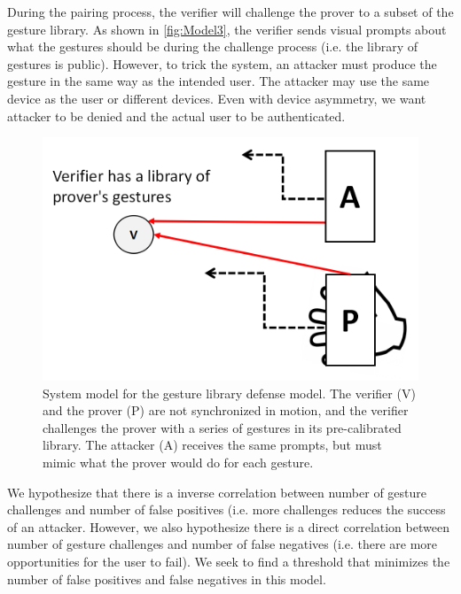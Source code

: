 \begin{itemize}
During the pairing process, the verifier will challenge the prover to a subset of the gesture library. As shown in \autoref{fig:Model3}, the verifier sends visual prompts about what the gestures should be during the challenge process (i.e. the library of gestures is public). However, to trick the system, an attacker must produce the gesture in the same way as the intended user. The attacker may use the same device as the user or different devices. Even with device asymmetry, we want attacker to be denied and the actual user to be authenticated. 

\begin{figure}[!tb]
\centering
\includegraphics[width=0.65 \linewidth]{./figures/model3.png}
\caption{System model for the gesture library defense model. The verifier (V) and the prover (P) are not synchronized in motion, and the verifier challenges the prover with a series of gestures in its pre-calibrated library. The attacker (A) receives the same prompts, but must mimic what the prover would do for each gesture.}
\label{fig:Model3}
\end{figure}

We hypothesize that there is a inverse correlation between number of gesture challenges and number of false positives (i.e. more challenges reduces the success of an attacker. However, we also hypothesize there is a direct correlation between number of gesture challenges and number of false negatives (i.e. there are more opportunities for the user to fail). We seek to find a threshold that minimizes the number of false positives and false negatives in this model.

\end{itemize}

